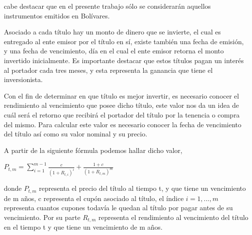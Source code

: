 \noindent cabe destacar que en el presente trabajo s\'olo  se considerar\'an aquellos instrumentos emitidos en Bol\'ivares.

\vspace{0.5cm}

\hspace*{0.4 cm}Asociado a cada t\'itulo hay un monto de dinero que se invierte, el cual es entregado al ente emisor por el t\'itulo en s\'i, existe tambi\'en una fecha de emisi\'on, y una fecha de vencimiento, d\'ia en el cual el ente emisor retorna el monto invertido inicialmente. Es importante destacar que estos t\'itulos pagan un inter\'es al portador cada tres meses, y esta representa la ganancia que tiene el inversionista.

\vspace{0.5cm}

\hspace*{0.4 cm} Con el fin de determinar en que t\'itulo es mejor invertir, es necesario conocer el rendimiento al vencimiento que posee dicho t\'itulo, este valor nos da un idea de cu\'al ser\'a el retorno que recibir\'a el portador del t\'itulo por la tenencia o compra del mismo. Para calcular este valor es necesario conocer la fecha de vencimiento del t\'itulo as\'i como su valor nominal y su precio.


 \hspace*{0.4 cm} A partir de la siguiente f\'ormula podemos hallar dicho valor,

\vspace{0.5cm}

\begin{center}

$\displaystyle{P_{t,m} = \sum_{i=1}^{m-1}{\frac{c}{(1+R_{t,i})^i} + \frac{1+c}{(1+R_{t,m})^m}} }$

\end{center}

\vspace{0.5cm}

\noindent donde $P_{t,m}$ representa el precio del t\'itulo al tiempo t, y que tiene un vencimiento de m a\~nos, c representa el cup\'on asociado al t\'itulo, el \'indice $i = 1,...,m$ representa cuantos cupones todav\'ia le quedan al t\'itulo por pagar antes de su vencimiento. Por su parte $R_{t,m}$ representa el rendimiento al vencimiento del t\'itulo en el tiempo t y que tiene un vencimiento de m a\~nos.

\vspace{0.5cm}

